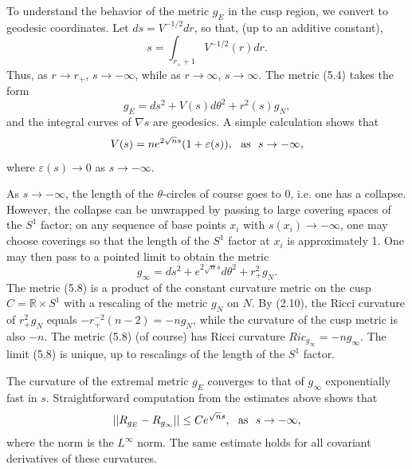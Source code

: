 \documentclass[11pt,amsfonts]{amsart}
\begin{document}
 To understand the behavior of the metric $g_{E}$ in the cusp region, 
we convert to geodesic coordinates.  Let $ds = V^{-1/2}dr$, so that, 
(up to an additive constant),
\begin{equation} \label{e5.5}
s = \int_{r_{+}+1}V^{-1/2}(r)dr.
\end{equation}
Thus, as $r \rightarrow  r_{+}$, $s \rightarrow  -\infty$, while as $r 
\rightarrow  \infty$, $s \rightarrow  \infty$. The metric (5.4) takes 
the form
\begin{equation} \label{e5.6}
g_{E} = ds^{2} + V(s)d\theta^{2} + r^{2}(s)g_{N}, 
\end{equation}
and the integral curves of $\nabla s$ are geodesics.  A simple 
calculation shows that
\begin{equation} \label{e5.7}
V(s) = ne^{2\sqrt{n}s}(1 + \varepsilon (s)), \ \ {\rm as} \ \  
s \rightarrow  -\infty , 
\end{equation}
where $\varepsilon (s) \rightarrow 0$ as $s \rightarrow -\infty$. 

 As $s \rightarrow  -\infty$, the length of the $\theta$-circles of 
course goes to 0, i.e. one has a collapse. However, the collapse can be 
unwrapped by passing to large covering spaces of the $S^{1}$ factor; on 
any sequence of base points $x_{i}$ with $s(x_{i}) \rightarrow  -\infty$, 
one may choose coverings so that the length of the $S^{1}$ factor at 
$x_{i}$ is approximately 1. One may then pass to a pointed limit to 
obtain the metric
\begin{equation} \label{e5.8}
g_{\infty} = ds^{2} + e^{2\sqrt{n}s}d\theta^{2} + r_{+}^{2}g_{N}. 
\end{equation}
The metric (5.8) is a product of the constant curvature metric on the 
cusp $C = {\mathbb R}\times S^{1}$ with a rescaling of the metric $g_{N}$ on 
$N$. By (2.10), the Ricci curvature of $r_{+}^{2}g_{N}$ equals 
$-r_{+}^{-2}(n-2) = -ng_{N}$, while the curvature of the cusp metric is 
also $-n$. The metric (5.8) (of course) has Ricci curvature 
$Ric_{g_{\infty}} = -ng_{\infty}$. The limit (5.8) is unique, up to 
rescalings of the length of the $S^{1}$ factor.

 The curvature of the extremal metric $g_{E}$ converges to that of 
$g_{\infty}$ exponentially fast in $s$. Straightforward computation from 
the estimates above shows that
\begin{equation} \label{e5.9}
||R_{g_{E}} - R_{g_{\infty}}|| \leq  Ce^{\sqrt{n}s}, \ \ {\rm as} \ \  
s \rightarrow  -\infty , 
\end{equation}
where the norm is the $L^{\infty}$ norm. The same estimate holds for 
all covariant derivatives of these curvatures.  
\end{document}
